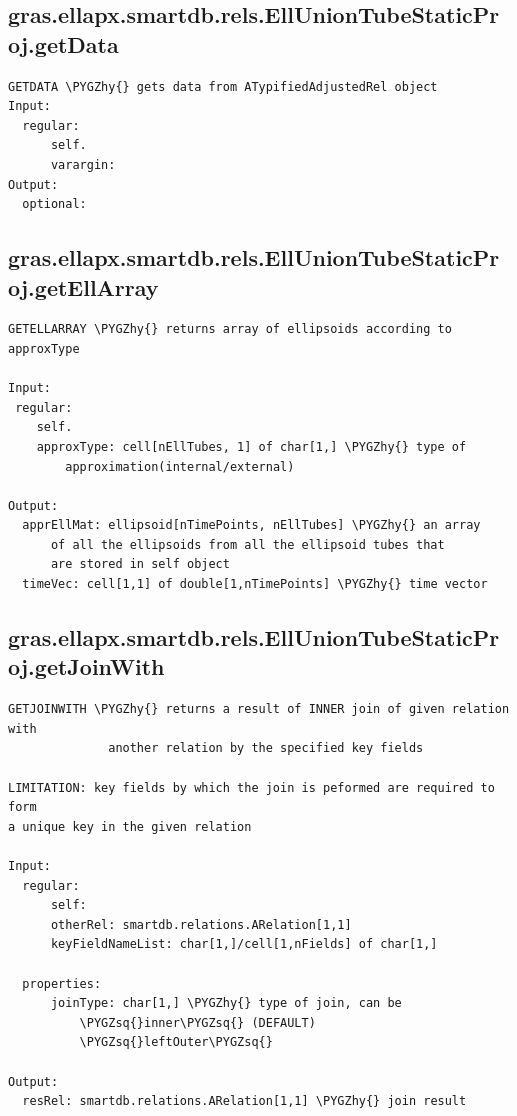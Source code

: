\documentclass[letterpaper,10pt,english]{sphinxmanual}
\def\PYGZhy{\char`\-}
\def\PYGZsq{\char`\'}
\begin{document}
\subsection{gras.ellapx.smartdb.rels.EllUnionTubeStaticProj.getData}
\label{chap_functions:gras-ellapx-smartdb-rels-elluniontubestaticproj-getdata}
\begin{Verbatim}[commandchars=\\\{\}]
GETDATA \PYGZhy{} gets data from ATypifiedAdjustedRel object
Input:
  regular:
      self.
      varargin:
Output:
  optional:
\end{Verbatim}


\subsection{gras.ellapx.smartdb.rels.EllUnionTubeStaticProj.getEllArray}
\label{chap_functions:gras-ellapx-smartdb-rels-elluniontubestaticproj-getellarray}
\begin{Verbatim}[commandchars=\\\{\}]
GETELLARRAY \PYGZhy{} returns array of ellipsoids according to
approxType

Input:
 regular:
    self.
    approxType: cell[nEllTubes, 1] of char[1,] \PYGZhy{} type of
        approximation(internal/external)

Output:
  apprEllMat: ellipsoid[nTimePoints, nEllTubes] \PYGZhy{} an array
      of all the ellipsoids from all the ellipsoid tubes that
      are stored in self object
  timeVec: cell[1,1] of double[1,nTimePoints] \PYGZhy{} time vector
\end{Verbatim}


\subsection{gras.ellapx.smartdb.rels.EllUnionTubeStaticProj.getJoinWith}
\label{chap_functions:gras-ellapx-smartdb-rels-elluniontubestaticproj-getjoinwith}
\begin{Verbatim}[commandchars=\\\{\}]
GETJOINWITH \PYGZhy{} returns a result of INNER join of given relation with
              another relation by the specified key fields

LIMITATION: key fields by which the join is peformed are required to form
a unique key in the given relation

Input:
  regular:
      self:
      otherRel: smartdb.relations.ARelation[1,1]
      keyFieldNameList: char[1,]/cell[1,nFields] of char[1,]

  properties:
      joinType: char[1,] \PYGZhy{} type of join, can be
          \PYGZsq{}inner\PYGZsq{} (DEFAULT)
          \PYGZsq{}leftOuter\PYGZsq{}

Output:
  resRel: smartdb.relations.ARelation[1,1] \PYGZhy{} join result
\end{Verbatim}
\end{document}
